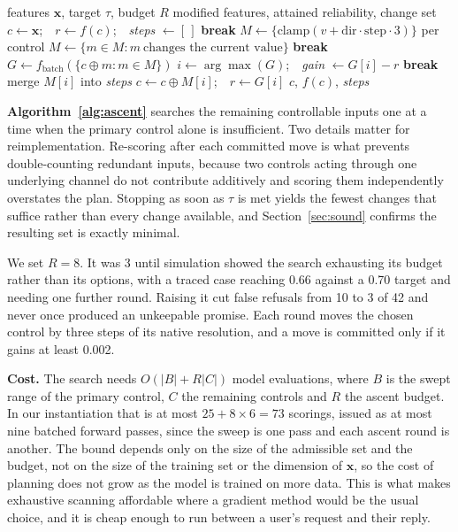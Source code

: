 \documentclass[conference]{IEEEtran}
\begin{document}
\begin{algorithm}[t]
\caption{Greedy coordinate ascent over remaining controls}
\label{alg:ascent}
\begin{algorithmic}[1]
\Require features $\mathbf{x}$, target $\tau$, budget $R$
\Ensure modified features, attained reliability, change set
\State $c \gets \mathbf{x}$;\ \ $r \gets f(c)$;\ \ \textit{steps} $\gets [\,]$
   \textbf{break} \EndIf
  \State $M \gets \{\text{clamp}(v + \text{dir}\cdot\text{step}\cdot 3)\}$ per control
  \State $M \gets \{m \in M : m\ \text{changes the current value}\}$
   \textbf{break} \EndIf
  \State $G \gets f_{\text{batch}}(\{c \oplus m : m \in M\})$
  \State $i \gets \arg\max(G)$;\ \ \textit{gain} $\gets G[i] - r$
   \textbf{break} \EndIf
  \State merge $M[i]$ into \textit{steps} 
  \State $c \gets c \oplus M[i]$;\ \ $r \gets G[i]$
\EndFor
\State \Return $c$, $f(c)$, \textit{steps}
\end{algorithmic}
\end{algorithm}

\textbf{Algorithm~\ref{alg:ascent}} searches the remaining controllable inputs
one at a time when the primary control alone is insufficient. Two details matter
for reimplementation. Re-scoring after each committed move is what prevents
double-counting redundant inputs, because two controls acting through one
underlying channel do not contribute additively and scoring them independently
overstates the plan. Stopping as soon as $\tau$ is met yields the fewest changes
that suffice rather than every change available, and
Section~\ref{sec:sound} confirms the resulting set is exactly minimal.

We set $R = 8$. It was 3 until simulation showed the search exhausting its
budget rather than its options, with a traced case reaching 0.66 against a 0.70
target and needing one further round. Raising it cut false refusals from 10 to 3
of 42 and never once produced an unkeepable promise. Each round moves the chosen
control by three steps of its native resolution, and a move is committed only if
it gains at least 0.002.

\textbf{Cost.} The search needs $O(|B| + R|C|)$ model evaluations, where $B$ is
the swept range of the primary control, $C$ the remaining controls and $R$ the
ascent budget. In our instantiation that is at most $25 + 8 \times 6 = 73$
scorings, issued as at most nine batched forward passes, since the sweep is one
pass and each ascent round is another. The bound depends only on the size of the
admissible set and the budget, not on the size of the training set or the
dimension of $\mathbf{x}$, so the cost of planning does not grow as the model is
trained on more data. This is what makes exhaustive scanning affordable where a
gradient method would be the usual choice, and it is cheap enough to run between
a user's request and their reply.
\end{document}
